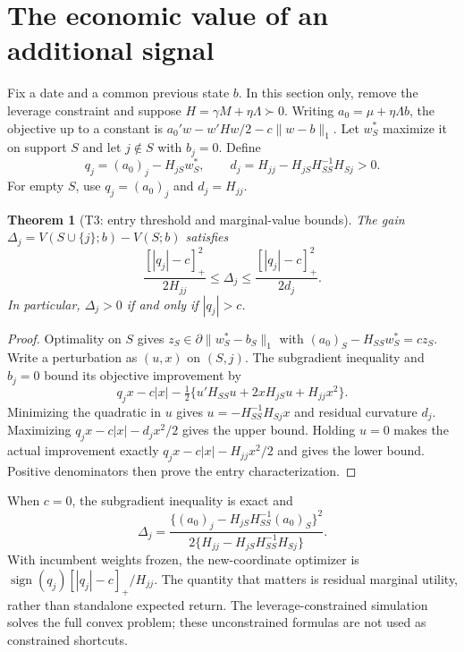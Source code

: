 \documentclass[11pt,a4paper]{article}
\newtheorem{theorem}{Theorem}
\theoremstyle{remark}\newtheorem{remark}[theorem]{Remark}
\newcommand{\norm}[1]{\lVert#1\rVert}\newcommand{\pos}[1]{[#1]_+}
\begin{document}
\section{The economic value of an additional signal}
Fix a date and a common previous state $b$. In this section only, remove the
leverage constraint and suppose $H=\gamma M+\eta\Lambda\succ0$.
Writing $a_0=\mu+\eta\Lambda b$, the objective up to a constant is
$a_0'w-w'Hw/2-c\norm{w-b}_1$.
Let $w_S^*$ maximize it on support $S$ and let $j\notin S$ with $b_j=0$.
Define
\begin{equation}
 q_j=(a_0)_j-H_{jS}w_S^*,\qquad
 d_j=H_{jj}-H_{jS}H_{SS}^{-1}H_{Sj}>0.
\end{equation}
For empty $S$, use $q_j=(a_0)_j$ and $d_j=H_{jj}$.

\begin{theorem}[T3: entry threshold and marginal-value bounds]
The gain $\Delta_j=V(S\cup\{j\};b)-V(S;b)$ satisfies
\begin{equation}
 \frac{\pos{|q_j|-c}^2}{2H_{jj}}
 \le\Delta_j\le\frac{\pos{|q_j|-c}^2}{2d_j}.
\end{equation}
In particular, $\Delta_j>0$ if and only if $|q_j|>c$.
\end{theorem}
\begin{proof}
Optimality on $S$ gives $z_S\in\partial\norm{w_S^*-b_S}_1$ with
$(a_0)_S-H_{SS}w_S^*=cz_S$. Write a perturbation as $(u,x)$ on $(S,j)$.
The subgradient inequality and $b_j=0$ bound its objective improvement by
\[
 q_jx-c|x|-\tfrac12\{u'H_{SS}u+2xH_{jS}u+H_{jj}x^2\}.
\]
Minimizing the quadratic in $u$ gives $u=-H_{SS}^{-1}H_{Sj}x$ and residual
curvature $d_j$. Maximizing $q_jx-c|x|-d_jx^2/2$ gives the upper bound.
Holding $u=0$ makes the actual improvement exactly
$q_jx-c|x|-H_{jj}x^2/2$ and gives the lower bound. Positive denominators
then prove the entry characterization.
\end{proof}

When $c=0$, the subgradient inequality is exact and
\begin{equation}
 \Delta_j=
 \frac{\{(a_0)_j-H_{jS}H_{SS}^{-1}(a_0)_S\}^2}
 {2\{H_{jj}-H_{jS}H_{SS}^{-1}H_{Sj}\}}.
\end{equation}
With incumbent weights frozen, the new-coordinate optimizer is
$\operatorname{sign}(q_j)\pos{|q_j|-c}/H_{jj}$.
The quantity that matters is residual marginal utility, rather than standalone
expected return. The leverage-constrained simulation solves the full convex
problem; these unconstrained formulas are not used as constrained shortcuts.
\end{document}
